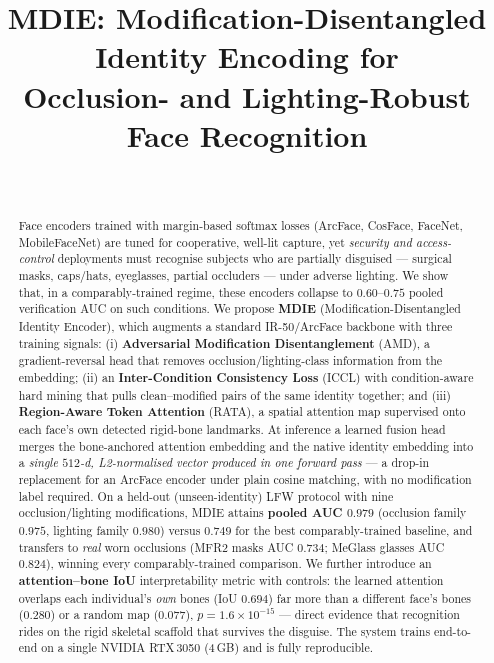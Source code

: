 \documentclass[10pt,conference]{IEEEtran}
\title{MDIE: Modification-Disentangled Identity Encoding for\\
       Occlusion- and Lighting-Robust Face Recognition}
\author{\IEEEauthorblockN{Anonymous Submission}\\
        \IEEEauthorblockA{Manuscript under review}}
\begin{document}
\maketitle

\begin{abstract}
Face encoders trained with margin-based softmax losses (ArcFace, CosFace,
FaceNet, MobileFaceNet) are tuned for cooperative, well-lit capture, yet
\emph{security and access-control} deployments must recognise subjects who are
partially disguised --- surgical masks, caps/hats, eyeglasses, partial
occluders --- under adverse lighting. We show that, in a comparably-trained
regime, these encoders collapse to $0.60$--$0.75$ pooled verification AUC on
such conditions. We propose \textbf{MDIE} (Modification-Disentangled Identity
Encoder), which augments a standard IR-50/ArcFace backbone with three training
signals: (i) \textbf{Adversarial Modification Disentanglement} (AMD), a
gradient-reversal head that removes occlusion/lighting-class information from
the embedding; (ii) an \textbf{Inter-Condition Consistency Loss} (ICCL) with
condition-aware hard mining that pulls clean--modified pairs of the same
identity together; and (iii) \textbf{Region-Aware Token Attention} (RATA), a
spatial attention map supervised onto each face's own detected rigid-bone
landmarks. At inference a learned fusion head merges the bone-anchored
attention embedding and the native identity embedding into a \emph{single
$512$-d, L2-normalised vector produced in one forward pass} --- a drop-in
replacement for an ArcFace encoder under plain cosine matching, with no
modification label required. On a held-out (unseen-identity) LFW protocol with
nine occlusion/lighting modifications, MDIE attains \textbf{pooled AUC $0.979$}
(occlusion family $0.975$, lighting family $0.980$) versus $0.749$ for the best
comparably-trained baseline, and transfers to \emph{real} worn occlusions
(MFR2 masks AUC $0.734$; MeGlass glasses AUC $0.824$), winning every
comparably-trained comparison. We further introduce an \textbf{attention--bone
IoU} interpretability metric with controls: the learned attention overlaps each
individual's \emph{own} bones (IoU $0.694$) far more than a different face's
bones ($0.280$) or a random map ($0.077$), $p\!=\!1.6\!\times\!10^{-15}$ ---
direct evidence that recognition rides on the rigid skeletal scaffold that
survives the disguise. The system trains end-to-end on a single NVIDIA
RTX\,3050 (4\,GB) and is fully reproducible.
\end{abstract}
\end{document}
